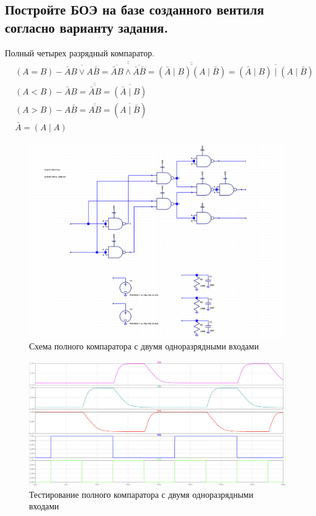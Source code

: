 \documentclass[12pt,onecolumn]{article}
\begin{document}
\subsection{Постройте БОЭ на базе созданного вентиля согласно варианту задания.}
Полный четырех разрядный компаратор.
$$
\begin{aligned}
    & (A = B)- \overline{\bar{A} B \vee A \bar{B}}=\overline{\overline{\overline{\bar{A} B} \wedge \overline{\bar{A} \bar{B}}}}
= \overline{\overline{(\bar{A} \mid B)(A \mid \bar{B})}}=\overline{(\bar{A} \mid B) \mid(A \mid \bar{B})}\\
& (A<B)-\bar{A} B=\overline{\overline{\bar{A} B}}=\overline{(\bar{A} \mid B)} \\
& (A>B)-A \bar{B}=\overline{\overline{A B}}=(\overline{A \mid \bar{B}})\\
& \bar{A} = (A \mid A)
\end{aligned}
$$
\begin{figure}[H]
    \centering
    \includegraphics[width=\textwidth]{image/full-comparator1.png}
    \caption{Схема полного компаратора с двумя одноразрядными входами}
\end{figure}
\begin{figure}[H]
    \centering
    \includegraphics[width=\textwidth]{image/full-comparator1-test.png}
    \caption{Тестирование полного компаратора с двумя одноразрядными входами} 
\end{figure}
\end{document}

